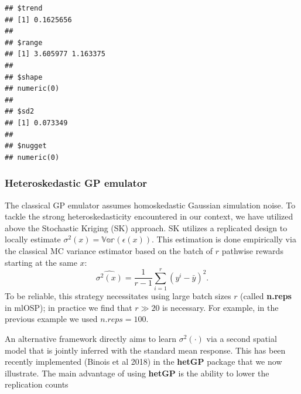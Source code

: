 \documentclass[]{article}
\newenvironment{Shaded}{\begin{snugshade}}{\end{snugshade}}
\newcommand{\KeywordTok}[1]{\textcolor[rgb]{0.13,0.29,0.53}{\textbf{#1}}}
\newcommand{\DataTypeTok}[1]{\textcolor[rgb]{0.13,0.29,0.53}{#1}}
\newcommand{\DecValTok}[1]{\textcolor[rgb]{0.00,0.00,0.81}{#1}}
\newcommand{\FloatTok}[1]{\textcolor[rgb]{0.00,0.00,0.81}{#1}}
\newcommand{\StringTok}[1]{\textcolor[rgb]{0.31,0.60,0.02}{#1}}
\newcommand{\CommentTok}[1]{\textcolor[rgb]{0.56,0.35,0.01}{\textit{#1}}}
\newcommand{\OperatorTok}[1]{\textcolor[rgb]{0.81,0.36,0.00}{\textbf{#1}}}
\newcommand{\NormalTok}[1]{#1}
\begin{document}
\begin{Shaded}
\end{Shaded}

\begin{verbatim}
## $trend
## [1] 0.1625656
##
## $range
## [1] 3.605977 1.163375
##
## $shape
## numeric(0)
##
## $sd2
## [1] 0.073349
##
## $nugget
## numeric(0)
\end{verbatim}

\subsubsection{Heteroskedastic GP
emulator}\label{heteroskedastic-gp-emulator}

The classical GP emulator assumes homoskedastic Gaussian simulation
noise. To tackle the strong heteroskedasticity encountered in our
context, we have utilized above the Stochastic Kriging (SK) approach. SK
utilizes a replicated design to locally estimate
\(\sigma^2(x) = \mathbb{Var}(\epsilon(x))\). This estimation is done
empirically via the classical MC variance estimator based on the batch
of \(r\) pathwise rewards starting at the same \(x\):
\[ \hat{\sigma^2(x)} = \frac{1}{r-1} \sum_{i=1}^r (y^i - \bar{y})^2.\]
To be reliable, this strategy necessitates using large batch sizes \(r\)
(called \textbf{n.reps} in mlOSP); in practice we find that \(r \gg 20\)
is necessary. For example, in the previous example we used
\(n.reps = 100\).

An alternative framework directly aims to learn \(\sigma^2(\cdot)\) via
a second spatial model that is jointly inferred with the standard mean
response. This has been recently implemented (Binois et al 2018) in the
\textbf{hetGP} package that we now illustrate. The main advantage of
using \textbf{hetGP} is the ability to lower the replication counts

\begin{Shaded}
\end{Shaded}
\end{document}

